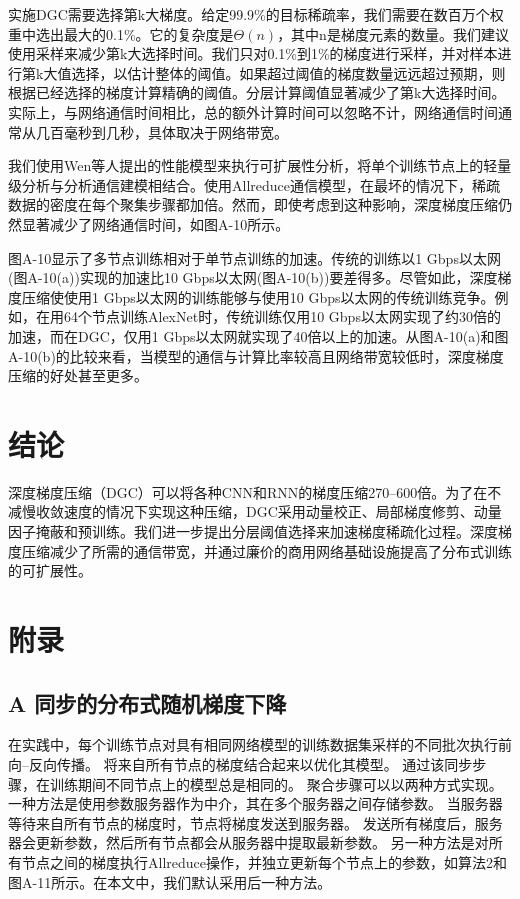 实施DGC需要选择第k大梯度。给定99.9\%的目标稀疏率，我们需要在数百万个权重中选出最大的0.1\%。它的复杂度是$\Theta(n)$，其中n是梯度元素的数量。我们建议使用采样来减少第k大选择时间。我们只对0.1\%到1\%的梯度进行采样，并对样本进行第k大值选择，以估计整体的阈值。如果超过阈值的梯度数量远远超过预期，则根据已经选择的梯度计算精确的阈值。分层计算阈值显著减少了第k大选择时间。实际上，与网络通信时间相比，总的额外计算时间可以忽略不计，网络通信时间通常从几百毫秒到几秒，具体取决于网络带宽。

我们使用Wen等人提出的性能模型来执行可扩展性分析，将单个训练节点上的轻量级分析与分析通信建模相结合。使用Allreduce通信模型，在最坏的情况下，稀疏数据的密度在每个聚集步骤都加倍。然而，即使考虑到这种影响，深度梯度压缩仍然显著减少了网络通信时间，如图A-10所示。

图A-10显示了多节点训练相对于单节点训练的加速。传统的训练以1 Gbps以太网(图A-10(a))实现的加速比10 Gbps以太网(图A-10(b))要差得多。尽管如此，深度梯度压缩使使用1 Gbps以太网的训练能够与使用10 Gbps以太网的传统训练竞争。例如，在用64个节点训练AlexNet时，传统训练仅用10 Gbps以太网实现了约30倍的加速，而在DGC，仅用1 Gbps以太网就实现了40倍以上的加速。从图A-10(a)和图A-10(b)的比较来看，当模型的通信与计算比率较高且网络带宽较低时，深度梯度压缩的好处甚至更多。

\section{结论}
深度梯度压缩（DGC）可以将各种CNN和RNN的梯度压缩270--600倍。为了在不减慢收敛速度的情况下实现这种压缩，DGC采用动量校正、局部梯度修剪、动量因子掩蔽和预训练。我们进一步提出分层阈值选择来加速梯度稀疏化过程。深度梯度压缩减少了所需的通信带宽，并通过廉价的商用网络基础设施提高了分布式训练的可扩展性。

\section{附录}
\subsection{A 同步的分布式随机梯度下降}
在实践中，每个训练节点对具有相同网络模型的训练数据集采样的不同批次执行前向--反向传播。 将来自所有节点的梯度结合起来以优化其模型。 通过该同步步骤，在训练期间不同节点上的模型总是相同的。 聚合步骤可以以两种方式实现。 一种方法是使用参数服务器作为中介，其在多个服务器之间存储参数。 当服务器等待来自所有节点的梯度时，节点将梯度发送到服务器。 发送所有梯度后，服务器会更新参数，然后所有节点都会从服务器中提取最新参数。 另一种方法是对所有节点之间的梯度执行Allreduce操作，并独立更新每个节点上的参数，如算法2和图A-11所示。在本文中，我们默认采用后一种方法。

